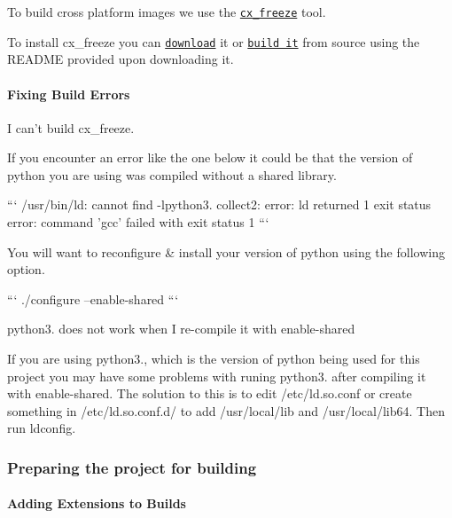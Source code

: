 To build cross platform images we use the \href{http://cx-freeze.sourceforge.net/}{\tt cx\-\_\-freeze} tool.

To install cx\-\_\-freeze you can \href{http://cx-freeze.sourceforge.net/index.html}{\tt download} it or \href{http://cx-freeze.sourceforge.net/index.html}{\tt build it} from source using the R\-E\-A\-D\-M\-E provided upon downloading it.

\paragraph*{Fixing Build Errors}


\begin{DoxyItemize}
\item I can't build cx\-\_\-freeze.
\end{DoxyItemize}

If you encounter an error like the one below it could be that the version of python you are using was compiled without a shared library.

``` /usr/bin/ld\-: cannot find -\/lpython3. collect2\-: error\-: ld returned 1 exit status error\-: command 'gcc' failed with exit status 1 ```

You will want to reconfigure \& install your version of python using the following option.

``` ./configure --enable-\/shared ```


\begin{DoxyItemize}
\item python3. does not work when I re-\/compile it with enable-\/shared
\end{DoxyItemize}

If you are using python3., which is the version of python being used for this project you may have some problems with runing python3. after compiling it with enable-\/shared. The solution to this is to edit /etc/ld.so.\-conf or create something in /etc/ld.so.\-conf.\-d/ to add /usr/local/lib and /usr/local/lib64. Then run ldconfig.

\subsubsection*{Preparing the project for building}

\paragraph*{Adding Extensions to Builds}

